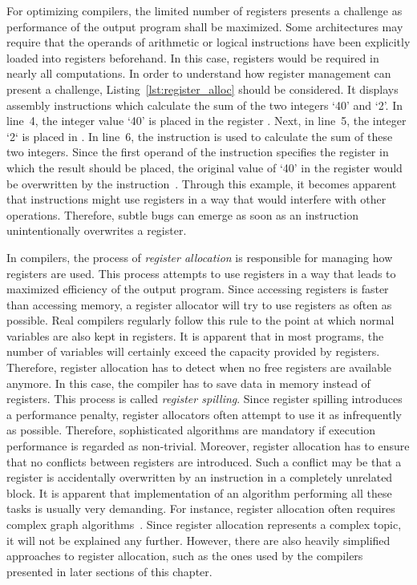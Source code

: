 
For optimizing compilers, the limited number of registers presents a challenge as performance of the output program shall be maximized.
Some architectures may require that the operands of arithmetic or logical instructions have been explicitly loaded into registers beforehand.
In this case, registers would be required in nearly all computations.
In order to understand how register management can present a challenge, Listing~\ref{lst:register_alloc} should be considered.
It displays \riscv{} assembly instructions which calculate the sum of the two integers `40' and `2'.
In line~4, the integer value `40' is placed in the register .
Next, in line~5, the integer `2` is placed in .
In line~6, the  instruction is used to calculate the sum of these two integers.
Since the first operand of the instruction specifies the register in which the result should be placed,
the original value of `40' in the register  would be overwritten by the instruction~\cite[reference]{Patterson2017}.
Through this example, it becomes apparent that instructions might use registers in a way that would interfere with other operations.
Therefore, subtle bugs can emerge as soon as an instruction unintentionally overwrites a register.

In compilers, the process of \emph{register allocation} is responsible for managing how registers are used.
This process attempts to use registers in a way that leads to maximized efficiency of the output program.
Since accessing registers is faster than accessing memory, a register allocator will try to use registers as often as possible.
Real compilers regularly follow this rule to the point at which normal variables are also kept in registers.
It is apparent that in most programs, the number of variables will certainly exceed the capacity provided by registers.
Therefore, register allocation has to detect when no free registers are available anymore.
In this case, the compiler has to save data in memory instead of registers.
This process is called \emph{register spilling}.
Since register spilling introduces a performance penalty, register allocators often attempt to use it as infrequently as possible.
Therefore, sophisticated algorithms are mandatory if execution performance is regarded as non-trivial.
Moreover, register allocation has to ensure that no conflicts between registers are introduced.
Such a conflict may be that a register is accidentally overwritten by an instruction in a completely unrelated block.
It is apparent that implementation of an algorithm performing all these tasks is usually very demanding.
For instance, register allocation often requires complex graph algorithms~\cite[pp.212-214]{Watson2017}.
Since register allocation represents a complex topic, it will not be explained any further.
However, there are also heavily simplified approaches to register allocation,
such as the ones used by the compilers presented in later sections of this chapter.

